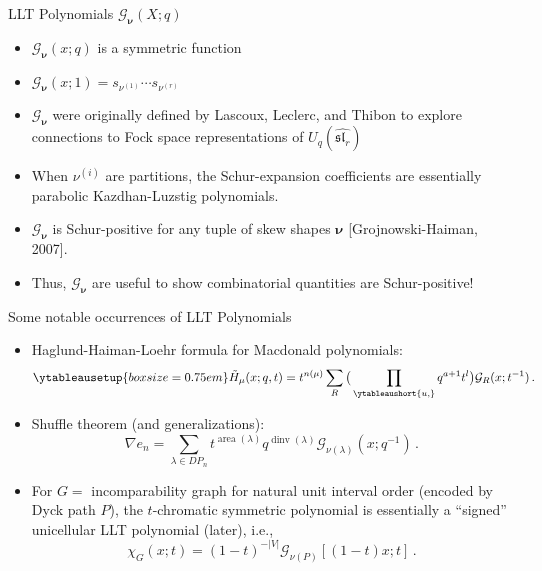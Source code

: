 \documentclass[dvipsnames]{beamer}
\newcommand{\xx}{x}%
\newcommand{\Htild}{\tilde{H}}
\newcommand{\Gcal}{{\mathcal G}}
\newcommand{\nubold}{{\boldsymbol \nu }}
\DeclareMathOperator{\dinv}{dinv}
\DeclareMathOperator{\area}{area}
\renewcommand{\sl}{\mathfrak{sl}}
\theoremstyle{definition}
\newcounter{c}
\begin{document}
\begin{frame}{LLT Polynomials \(\Gcal_\nubold(X;q)\)}
  \begin{itemize}
  \item \(\Gcal_\nubold(\xx;q)\) is a symmetric function\pause
  \item \(\Gcal_\nubold(\xx;1) = s_{\nu^{(1)}} \cdots s_{\nu^{(r)}}\)\pause
  \item \(\Gcal_\nubold\) were originally defined by Lascoux, Leclerc, and
    Thibon to explore connections to Fock space representations of \(U_q(\hat{\sl_r})\)\pause
  \item When \(\nu^{(i)}\) are partitions, the Schur-expansion
    coefficients are essentially parabolic Kazdhan-Luzstig polynomials.\pause
  \item \(\Gcal_\nubold\) is Schur-positive for any tuple of skew shapes \(\nubold\)
    [Grojnowski-Haiman, 2007].\pause
  \item Thus, \(\Gcal_\nubold\) are useful to show combinatorial quantities are Schur-positive!
  \end{itemize}
\end{frame}
\begin{frame}{Some notable occurrences of LLT Polynomials}
  \begin{itemize}
  \item Haglund-Haiman-Loehr formula for Macdonald polynomials:
    \[
      \ytableausetup{boxsize=0.75em}
      \Htild_\mu(\xx;q,t) =
      t^{n(\mu)} \sum_R \big( \prod_{\ytableaushort{u,{}}} q^{a+1}
        t^l\big) \Gcal_R(\xx;t^{-1})\,.
    \]\pause
  \item Shuffle theorem (and generalizations):
    \[
      \nabla e_n =
      \sum_{\lambda \in DP_n} t^{\area(\lambda)} q^{\dinv(\lambda)}
      \Gcal_{\nu(\lambda)}(\xx;q^{-1})\,.
    \]\pause
  \item For \(G = \) incomparability graph for natural unit interval
    order (encoded by Dyck path \(P\)), the \(t\)-chromatic symmetric
    polynomial is essentially a ``signed'' unicellular LLT polynomial (later), i.e.,
    \[
      \chi_G(x;t) = {(1-t)}^{-|V|} \Gcal_{\nu(P)}[(1-t)x;t] \,.
    \]
  \end{itemize}
\end{frame}
\end{document}
